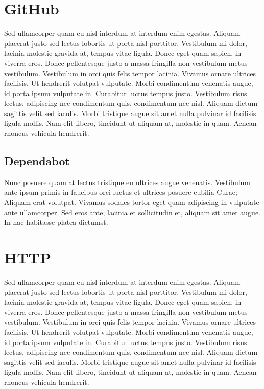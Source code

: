 
\section{GitHub}

Sed ullamcorper quam eu nisl interdum at interdum enim egestas. Aliquam placerat justo sed lectus lobortis ut porta nisl porttitor. Vestibulum mi dolor, lacinia molestie gravida at, tempus vitae ligula. Donec eget quam sapien, in viverra eros. Donec pellentesque justo a massa fringilla non vestibulum metus vestibulum. Vestibulum in orci quis felis tempor lacinia. Vivamus ornare ultrices facilisis. Ut hendrerit volutpat vulputate. Morbi condimentum venenatis augue, id porta ipsum vulputate in. Curabitur luctus tempus justo. Vestibulum risus lectus, adipiscing nec condimentum quis, condimentum nec nisl. Aliquam dictum sagittis velit sed iaculis. Morbi tristique augue sit amet nulla pulvinar id facilisis ligula mollis. Nam elit libero, tincidunt ut aliquam at, molestie in quam. Aenean rhoncus vehicula hendrerit.

\subsection{Dependabot}

Nunc posuere quam at lectus tristique eu ultrices augue venenatis. Vestibulum ante ipsum primis in faucibus orci luctus et ultrices posuere cubilia Curae; Aliquam erat volutpat. Vivamus sodales tortor eget quam adipiscing in vulputate ante ullamcorper. Sed eros ante, lacinia et sollicitudin et, aliquam sit amet augue. In hac habitasse platea dictumst.


\section{HTTP}

Sed ullamcorper quam eu nisl interdum at interdum enim egestas. Aliquam placerat justo sed lectus lobortis ut porta nisl porttitor. Vestibulum mi dolor, lacinia molestie gravida at, tempus vitae ligula. Donec eget quam sapien, in viverra eros. Donec pellentesque justo a massa fringilla non vestibulum metus vestibulum. Vestibulum in orci quis felis tempor lacinia. Vivamus ornare ultrices facilisis. Ut hendrerit volutpat vulputate. Morbi condimentum venenatis augue, id porta ipsum vulputate in. Curabitur luctus tempus justo. Vestibulum risus lectus, adipiscing nec condimentum quis, condimentum nec nisl. Aliquam dictum sagittis velit sed iaculis. Morbi tristique augue sit amet nulla pulvinar id facilisis ligula mollis. Nam elit libero, tincidunt ut aliquam at, molestie in quam. Aenean rhoncus vehicula hendrerit.

